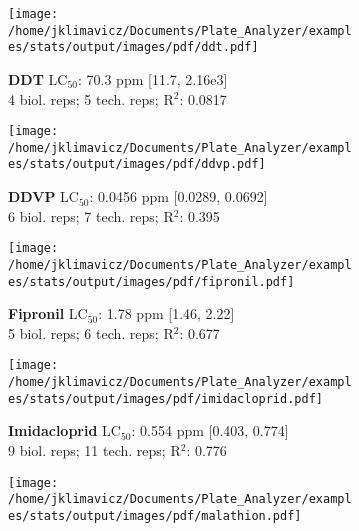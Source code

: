 \documentclass{article}
\begin{document}
\begin{figure}[thp!]
   \begin{subfigure}{0.500\textwidth}
      \centering
      \texttt{[image: /home/jklimavicz/Documents/Plate\_Analyzer/examples/stats/output/images/pdf/ddt.pdf]}
      \vspace{-0.05cm}
      \caption*{\textbf{DDT} LC$_{50}$: 70.3 ppm [11.7, 2.16e3] \\ 
4 biol. reps; 5 tech. reps; R$^2$: 0.0817}
      \vspace{0.1cm}
   \end{subfigure}%
   \begin{subfigure}{0.500\textwidth}
      \centering
      \texttt{[image: /home/jklimavicz/Documents/Plate\_Analyzer/examples/stats/output/images/pdf/ddvp.pdf]}
      \vspace{-0.05cm}
      \caption*{\textbf{DDVP} LC$_{50}$: 0.0456 ppm [0.0289, 0.0692] \\ 
6 biol. reps; 7 tech. reps; R$^2$: 0.395}
      \vspace{0.1cm}
   \end{subfigure}%
\vspace{-0.1cm}
   \begin{subfigure}{0.500\textwidth}
      \centering
      \texttt{[image: /home/jklimavicz/Documents/Plate\_Analyzer/examples/stats/output/images/pdf/fipronil.pdf]}
      \vspace{-0.05cm}
      \caption*{\textbf{Fipronil} LC$_{50}$: 1.78 ppm [1.46, 2.22] \\ 
5 biol. reps; 6 tech. reps; R$^2$: 0.677}
      \vspace{0.1cm}
   \end{subfigure}%
   \begin{subfigure}{0.500\textwidth}
      \centering
      \texttt{[image: /home/jklimavicz/Documents/Plate\_Analyzer/examples/stats/output/images/pdf/imidacloprid.pdf]}
      \vspace{-0.05cm}
      \caption*{\textbf{Imidacloprid} LC$_{50}$: 0.554 ppm [0.403, 0.774] \\ 
9 biol. reps; 11 tech. reps; R$^2$: 0.776}
      \vspace{0.1cm}
   \end{subfigure}%
\vspace{-0.1cm}
   \begin{subfigure}{0.500\textwidth}
      \centering
      \texttt{[image: /home/jklimavicz/Documents/Plate\_Analyzer/examples/stats/output/images/pdf/malathion.pdf]}

\end{subfigure}
\end{figure}
\end{document}
